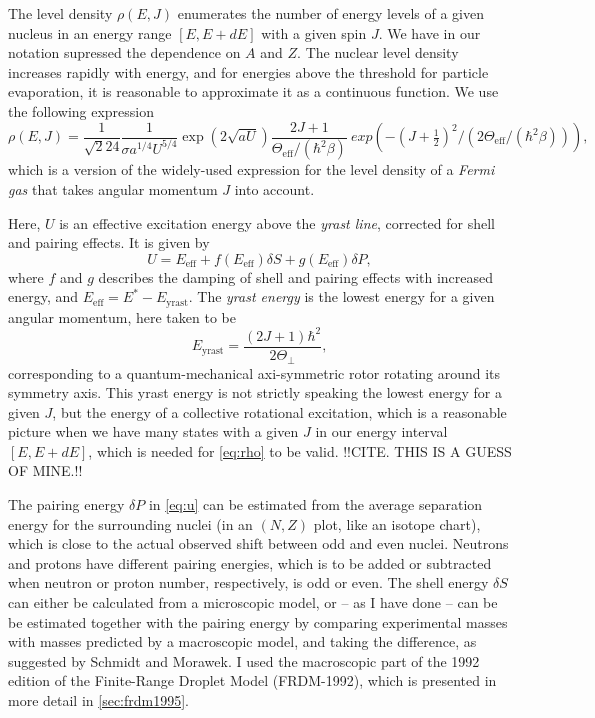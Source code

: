 The level density $\rho(E,J)$ enumerates the number of energy levels of a given nucleus in an energy range $[E,E+dE]$ with a given spin $J$. We have in our notation supressed the dependence on $A$ and $Z$. The nuclear level density increases rapidly with energy, and for energies above the threshold for particle evaporation, it is reasonable to approximate it as a continuous function.
We use the following expression
\begin{equation}
\rho(E,J) = \frac{1}{\sqrt{2}24}
\frac{1}{\sigma a^{1/4} U^{5/4}} \exp{(2\sqrt{aU})}
\frac{2J+1}{\Theta_\text{eff}/(\hbar^2\beta)}\ exp{\left(-(J+\tfrac{1}{2})^2/(2\Theta_\text{eff}/(\hbar^2\beta))\right)},\label{eq:rho}
\end{equation}
which is a version of the widely-used expression for the level density of a \emph{Fermi gas} that takes angular momentum $J$ into account\cite{ripl:2006}.

Here, $U$ is an effective excitation energy above the \emph{yrast line}, corrected for shell and pairing effects. It is given by
\begin{equation}
U=E_\text{eff} + f(E_\text{eff})\delta S + g(E_\text{eff})\delta P,\label{eq:u}
\end{equation}
where $f$ and $g$ describes the damping of shell and pairing effects with increased energy, and $E_\text{eff} = E^*-E_\text{yrast}$. The \emph{yrast energy} is the lowest energy for a given angular momentum, here taken to be
\begin{equation}
E_\text{yrast} = \frac{(2J+1)\hbar^2}{2\Theta_\perp},
\end{equation}
corresponding to a quantum-mechanical axi-symmetric rotor rotating around its symmetry axis. This yrast energy is not strictly speaking the lowest energy for a given $J$, but the energy of a collective rotational excitation, which is a reasonable picture when we have many states with a given $J$ in our energy interval $[E,E+dE]$, which is needed for \eqref{eq:rho} to be valid. !!CITE. THIS IS A GUESS OF MINE.!!

The pairing energy $\delta P$ in \eqref{eq:u} can be estimated from the average separation energy for the surrounding nuclei (in an $(N,Z)$ plot, like an isotope chart), which is close to the actual observed shift between odd and even nuclei\cite{ericson:1960}. Neutrons and protons have different pairing energies, which is to be added or subtracted when neutron or proton number, respectively, is odd or even. 
The shell energy $\delta S$ can either be calculated from a microscopic model, or -- as I have done -- can be be estimated together with the pairing energy by comparing experimental masses with masses predicted by a macroscopic model, and taking the difference, as suggested by Schmidt and Morawek\cite{schmidt:1991:art}. I used the macroscopic part of the 1992 edition of the Finite-Range Droplet Model (FRDM-1992)\cite{moller1995}, which is presented in more detail in \autoref{sec:frdm1995}.

